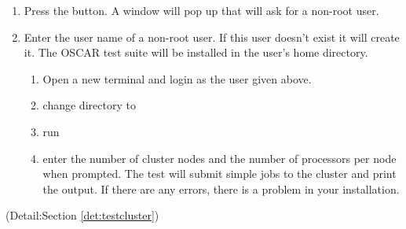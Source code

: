 \begin {enumerate}
        \begin{enumerate}
        \item Press the  button. A window will
        pop up that will ask for a non-root user. 
        \item Enter the user name of a non-root user. If this user doesn't
        exist it will create it. The OSCAR test suite will be installed
        in the user's home directory.
                \begin{enumerate}
                \item Open a new terminal and login as the user given above.
                \item change directory to 
                \item run 
                \item enter the number of cluster nodes and the number of 
                processors per node when prompted. The test will submit
                simple jobs to the cluster and print the output. If there
                are any errors, there is a problem in your installation.
                \end{enumerate}
         \end{enumerate}
(Detail:Section \ref{det:testcluster})

\end{enumerate}
